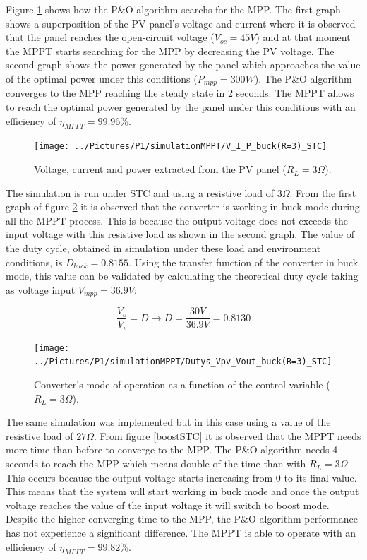  Figure \ref{buckSTC} shows how the P\&O algorithm searchs for the MPP. The first graph shows a superposition of the PV panel's voltage and current where it is observed that the panel reaches the open-circuit voltage ($V_{oc}=45 V$) and at that moment the MPPT starts searching for the MPP by decreasing the PV voltage. The second graph shows the power generated by the panel which approaches the value of the optimal power under this conditions ($P_{mpp}=300 W$). The P\&O algorithm converges to the MPP reaching the steady state in 2 seconds. The MPPT allows to reach the optimal power generated by the panel under this conditions with an efficiency of $\eta_{MPPT} = 99.96\% $.
\begin{figure}[H]
	\begin{center}
		\texttt{[image: ../Pictures/P1/simulationMPPT/V\_I\_P\_buck(R=3)\_STC]}
		\caption{Voltage, current and power extracted from the PV panel ($R_{L}=3\Omega$).}
		\label{buckSTC} 
	\end{center}	
\end{figure}

The simulation is run under STC and using a resistive load of $3\Omega$. From the first graph of figure \ref{buckSTC_duty} it is observed that the converter is working in buck mode during all the MPPT process. This is because the output voltage does not exceeds the input voltage with this resistive load as shown in the second graph. The value of the duty cycle, obtained in simulation under these load and environment conditions, is $D_{buck}= 0.8155$. Using the transfer function of the converter in  buck mode, this value can be validated by calculating the theoretical duty cycle taking as voltage input $V_{mpp}=36.9 V$: 

\begin{equation}\label{buckmodeTF}
\frac{V_o}{V_i} = D  \rightarrow D = \frac{30V}{36.9V}= 0.8130 
\end{equation}


\begin{figure}[H]
	\begin{center}
		\texttt{[image: ../Pictures/P1/simulationMPPT/Dutys\_Vpv\_Vout\_buck(R=3)\_STC]}
		\caption{Converter's mode of operation as a function of the control variable ($R_{L}=3\Omega$).}
		\label{buckSTC_duty} 
	\end{center}	
\end{figure}

The same simulation was implemented but in this case using a value of the resistive load of $27\Omega$. From figure \ref{boostSTC} it is observed that the MPPT needs more time than before to converge to the MPP. The P\&O algorithm needs 4 seconds to reach the MPP which means double of the time than with $R_{L}=3\Omega$. This occurs because the output voltage starts increasing from 0 to its final value. This means that the system will start working in buck mode and once the output voltage reaches the value of the input voltage it will switch to boost mode. Despite the higher converging time to the MPP, the P\&O algorithm performance has not experience a significant difference. The MPPT is able to operate with an efficiency of $\eta_{MPPT} = 99.82\% $.


